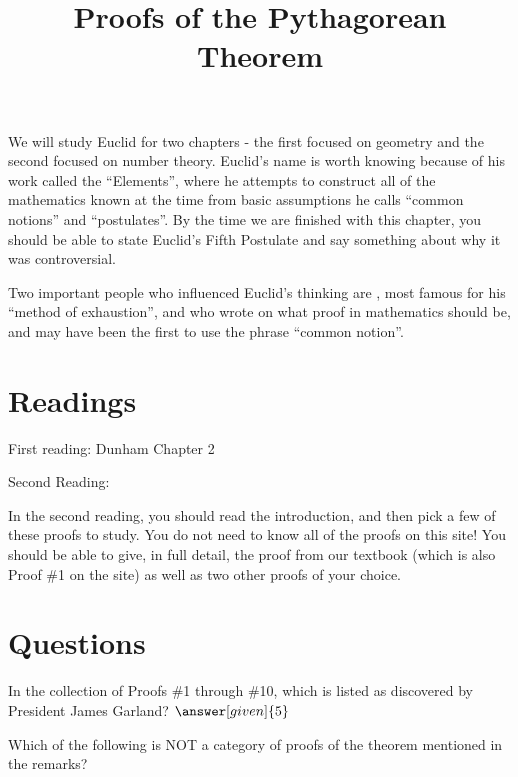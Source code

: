 \documentclass[nooutcomes]{ximera}
\title{Proofs of the Pythagorean Theorem}
\begin{document}
\begin{abstract}
    
\end{abstract}
\maketitle


We will study Euclid for two chapters - the first focused on geometry and the second focused on number theory.  Euclid's name is worth knowing because of his work called the ``Elements'', where he attempts to construct all of the mathematics known at the time from basic assumptions he calls ``common notions'' and ``postulates''.  By the time we are finished with this chapter, you should be able to state Euclid's Fifth Postulate and say something about why it was controversial.  

Two important people who influenced Euclid's thinking are , most famous for his ``method of exhaustion'', and  who wrote on what proof in mathematics should be, and may have been the first to use the phrase ``common notion''.


\section{Readings}
First reading: Dunham Chapter 2

Second Reading: 
  

In the second reading, you should read the introduction, and then pick a few of these proofs to study.  You do not need to know all of the proofs on this site!  You should be able to give, in full detail, the proof from our textbook (which is also Proof \#1 on the site) as well as two other proofs of your choice.


\section{Questions}

\begin{question}
In the collection of Proofs \#1 through \#10, which is listed as discovered by President James Garland?
$\answer[given]{5}$
\end{question}

\begin{question}
Which of the following is NOT a category of proofs of the theorem mentioned in the remarks?
\begin{multipleChoice}
\end{multipleChoice}
\end{question}

%
%
\end{document}
